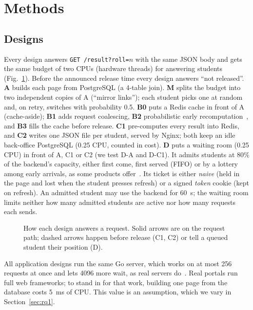 \section{Methods}
\label{sec:method}

\subsection{Designs}
\label{sec:designs}

Every design answers \texttt{GET /result?roll=$n$} with the same JSON body and
gets the same budget of two CPUs (hardware threads) for answering students
(Fig.~\ref{fig:designs}). Before the announced release time every design
answers ``not released''.
\textbf{A} builds each page from PostgreSQL (a 4-table join).
\textbf{M} splits the budget into two independent copies of A (``mirror
links''); each student picks one at random and, on retry, switches with
probability 0.5.
\textbf{B0} puts a Redis cache in front of A (cache-aside); \textbf{B1} adds
request coalescing, \textbf{B2} probabilistic early
recomputation~\cite{vattani2015xfetch}, and \textbf{B3} fills the cache before
release.
\textbf{C1} pre-computes every result into Redis, and \textbf{C2} writes one
JSON file per student, served by Nginx; both keep an idle back-office
PostgreSQL (0.25 CPU, counted in cost).
\textbf{D} puts a waiting room (0.25 CPU) in front of A, C1 or C2 (we test
D-A and D-C1). It admits
students at 80\% of the backend's capacity, either first come, first served
(FIFO) or by a lottery among early arrivals, as some products
offer~\cite{cloudflare2026queue}. Its ticket is either \emph{naive} (held in
the page and lost when the student presses refresh) or a signed \emph{token}
cookie (kept on refresh). An admitted student may use the backend for
\SI{60}{s}; the waiting room limits neither how many admitted students are
active nor how many requests each sends.

\begin{figure}[t]

\caption{How each design answers a request. Solid arrows are on the request
path; dashed arrows happen before release (C1, C2) or tell a queued student
their position (D).}
\label{fig:designs}
\end{figure}

All application designs run the same Go server, which works on at most 256
requests at once and lets 4096 more wait, as real servers
do~\cite{apache2026mpm}. Real portals run full web frameworks; to stand in
for that work, building one page from the database costs \SI{5}{ms} of CPU.
This value is an assumption, which we vary in Section~\ref{sec:rq1}.

